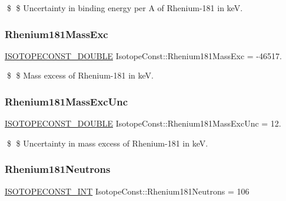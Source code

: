 \$ \$ Uncertainty in binding energy per A of Rhenium-\/181 in keV. \mbox{\label{group___isotope_const-_rhenium-_re181_ga79207d768d2c411d2112b60dbdc06f88}} 
\subsubsection{\texorpdfstring{Rhenium181\+Mass\+Exc}{Rhenium181MassExc}}
{\footnotesize\ttfamily \mbox{\hyperlink{group___isotope_const-_macros_ga8f45a7272ce02c0b4c65c44636ed719a}{I\+S\+O\+T\+O\+P\+E\+C\+O\+N\+S\+T\+\_\+\+D\+O\+U\+B\+LE}} Isotope\+Const\+::\+Rhenium181\+Mass\+Exc = -\/46517.}

\$ \$ Mass excess of Rhenium-\/181 in keV. \mbox{\label{group___isotope_const-_rhenium-_re181_ga2835233d7e6669d74e468825dcbf881b}} 
\subsubsection{\texorpdfstring{Rhenium181\+Mass\+Exc\+Unc}{Rhenium181MassExcUnc}}
{\footnotesize\ttfamily \mbox{\hyperlink{group___isotope_const-_macros_ga8f45a7272ce02c0b4c65c44636ed719a}{I\+S\+O\+T\+O\+P\+E\+C\+O\+N\+S\+T\+\_\+\+D\+O\+U\+B\+LE}} Isotope\+Const\+::\+Rhenium181\+Mass\+Exc\+Unc = 12.}

\$ \$ Uncertainty in mass excess of Rhenium-\/181 in keV. \mbox{\label{group___isotope_const-_rhenium-_re181_ga16fd7e328953417e1181e66e73cda123}} 
\subsubsection{\texorpdfstring{Rhenium181\+Neutrons}{Rhenium181Neutrons}}
{\footnotesize\ttfamily \mbox{\hyperlink{group___isotope_const-_macros_ga5f18360b3e99483a35c32d789e62621c}{I\+S\+O\+T\+O\+P\+E\+C\+O\+N\+S\+T\+\_\+\+I\+NT}} Isotope\+Const\+::\+Rhenium181\+Neutrons = 106}

